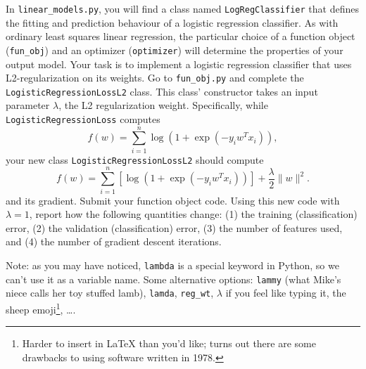 \documentclass{article}
\newcommand{\blu}[1]{{\textcolor{blu}{#1}}}
\let\ask\blu
\newcommand{\norm}[1]{\lVert #1 \rVert}
\begin{document}
In \verb|linear_models.py|, you will find a class named \verb|LogRegClassifier| that defines the fitting and prediction behaviour of a logistic regression classifier. As with ordinary least squares linear regression, the particular choice of a function object (\verb|fun_obj|) and an optimizer (\verb|optimizer|) will determine the properties of your output model.
Your task is to implement a logistic regression classifier that uses L2-regularization on its weights. Go to \verb|fun_obj.py| and complete the \verb|LogisticRegressionLossL2| class. This class' constructor takes an input parameter $\lambda$, the L2 regularization weight. Specifically, while \verb|LogisticRegressionLoss| computes
\[
f(w) = \sum_{i=1}^n \log(1+\exp(-y_iw^Tx_i)),
\]
your new class \verb|LogisticRegressionLossL2| should compute
\[
f(w) = \sum_{i=1}^n \left[\log(1+\exp(-y_iw^Tx_i))\right] + \frac{\lambda}{2}\norm{w}^2.
\]
and its gradient.
\ask{Submit your function object code. Using this new code with $\lambda = 1$, report how the following quantities change: (1) the training (classification) error, (2) the validation (classification) error, (3) the number of features used, and (4) the number of gradient descent iterations.}

Note: as you may have noticed, \verb|lambda| is a special keyword in Python, so we can't use it as a variable name.
Some alternative options:
\verb|lammy| (what Mike's niece calls her toy stuffed lamb),
\verb|lamda|,
\verb|reg_wt|,
$\lambda$ if you feel like typing it,
the sheep emoji\footnote{Harder to insert in \LaTeX{} than you'd like; turns out there are some drawbacks to using software written in 1978.},
\dots.
\end{document}
